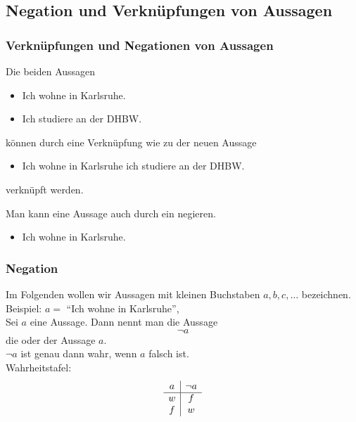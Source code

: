 \subsection{Negation und Verknüpfungen von Aussagen}
%
\begin{frame}\frametitle{Verknüpfungen und Negationen von Aussagen}
	
	Die beiden Aussagen
	\begin{itemize}
		\item Ich wohne in Karlsruhe.
		\item Ich studiere an der DHBW.
	\end{itemize}
	können durch eine Verknüpfung wie  zu der neuen Aussage
	\begin{itemize}
		\item Ich wohne in Karlsruhe  ich studiere an der DHBW.
	\end{itemize}
	verknüpft werden.
	
	\vfill
	Man kann eine Aussage auch durch ein  negieren.
	\begin{itemize}
		\item Ich wohne  in Karlsruhe.
	\end{itemize}
	
\end{frame}
%
%
\begin{frame}\frametitle{Negation}
		Im Folgenden wollen wir Aussagen mit kleinen Buchstaben $a, b, c, \ldots$ bezeichnen.\\[1mm]
	Beispiel: 
	$a = $ ``Ich wohne in Karlsruhe'',\\ 
	\vfill
	\pause
	Sei $a$ eine Aussage. Dann nennt man die Aussage
	$$
		\neg a
	$$ 
	die  oder  der Aussage $a$.\\[1mm]
	$\neg a$ ist genau dann wahr, wenn $a$ falsch ist.\\
	
	\pause
	\vfill
	Wahrheitstafel:
	$$
		\begin{array}{c | c}
			a	& \neg a	\\ \hline
			w	& f		\\
			f	& w
		\end{array}
	$$
	
\end{frame}
%
%
